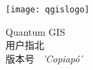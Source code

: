 
\begin{titlepage}
\begin{center}

\begin{center}
\texttt{[image: qgislogo]} 
\end{center}

\Huge{Quantum GIS}\\
\vspace{0.5cm}
\Large{用户指北} \\
\vspace{0.5cm}
\Large{版本号 ~\CURRENT \textsl{'Copiapó'}}

\end{center}
\end{titlepage}
